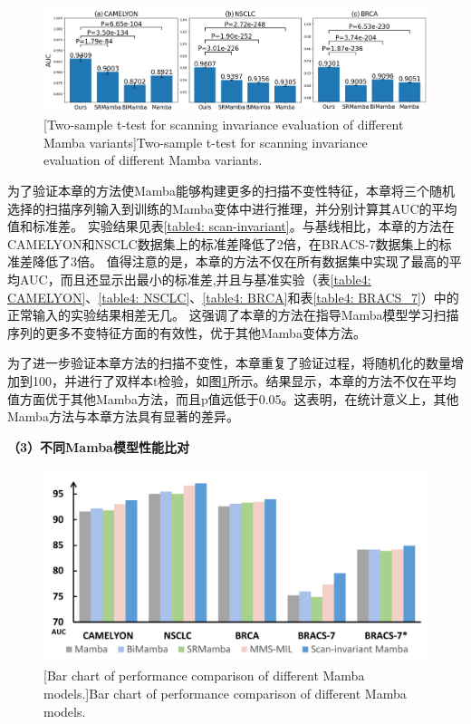 \begin{figure}[h!]
  \centering
  \includegraphics[width=1.0\columnwidth]{figures/scan_invariant.png}
  [Two-sample t-test for scanning invariance evaluation of different Mamba variants]{Two-sample t-test for scanning invariance evaluation of different Mamba variants.}
  \label{figure4: scan-invariant}
\end{figure}

为了验证本章的方法使Mamba能够构建更多的扫描不变性特征，本章将三个随机选择的扫描序列输入到训练的Mamba变体中进行推理，并分别计算其AUC的平均值和标准差。
实验结果见表\ref{table4: scan-invariant}。与基线相比，本章的方法在CAMELYON和NSCLC数据集上的标准差降低了2倍，在BRACS-7数据集上的标准差降低了3倍。
值得注意的是，本章的方法不仅在所有数据集中实现了最高的平均AUC，而且还显示出最小的标准差,并且与基准实验（表\ref{table4: CAMELYON}、\ref{table4: NSCLC}、\ref{table4: BRCA}和表\ref{table4: BRACS_7}）中的正常输入的实验结果相差无几。
这强调了本章的方法在指导Mamba模型学习扫描序列的更多不变特征方面的有效性，优于其他Mamba变体方法。

为了进一步验证本章方法的扫描不变性，本章重复了验证过程，将随机化的数量增加到100，并进行了双样本t检验，如图\ref{figure4: scan-invariant}所示。结果显示，本章的方法不仅在平均值方面优于其他Mamba方法，而且p值远低于0.05。这表明，在统计意义上，其他Mamba方法与本章方法具有显著的差异。

\textbf{（3）不同Mamba模型性能比对}

\begin{figure}[h!]
  \centering
  \includegraphics[width=0.9\columnwidth]{figures/SMCMIL的不同Mamba比较.pdf}
  [Bar chart of performance comparison of different Mamba models.]{Bar chart of performance comparison of different Mamba models.}
  \label{figure4: DifferentMamba}
\end{figure}

